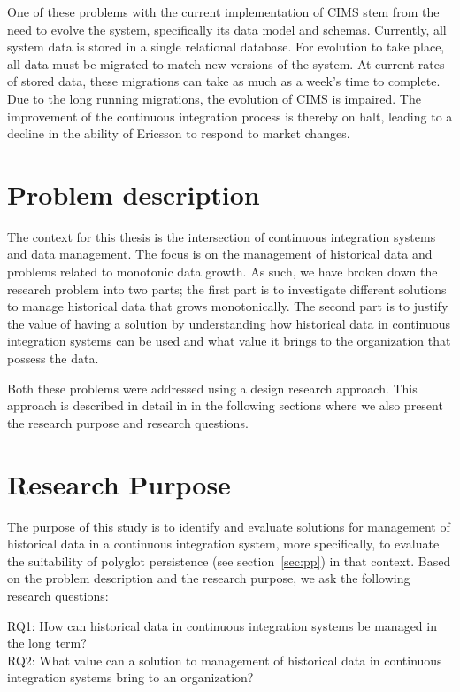 One of these problems with the current implementation of CIMS stem from the need to evolve the system, specifically its data model and schemas. Currently, all system data is stored in a single relational database. For evolution to take place, all data must be migrated to match new versions of the system. At current rates of stored data, these migrations can take as much as a week's time to complete. Due to the long running migrations, the evolution of CIMS is impaired. The improvement of the continuous integration process is thereby on halt, leading to a decline in the ability of Ericsson to respond to market changes.

\section{Problem description}
The context for this thesis is the intersection of continuous integration systems and data management. The focus is on the management of historical data and problems related to monotonic data growth. As such, we have broken down the research problem into two parts; the first part is to investigate different solutions to manage historical data that grows monotonically. The second part is to justify the value of having a solution by understanding how historical data in continuous integration systems can be used and what value it brings to the organization that possess the data. 

Both these problems were addressed using a design research approach. This approach is described in detail in in the following sections where we also present the research purpose and research questions.

\section{Research Purpose}
The purpose of this study is to identify and evaluate solutions for management of historical data in a continuous integration system, more specifically, to evaluate the suitability of polyglot persistence (see section~\ref{sec:pp}) in that context. Based on the problem description and the research purpose, we ask the following research questions:

RQ1: How can historical data in continuous integration systems be managed in the long term? \\
RQ2: What value can a solution to management of historical data in continuous integration systems bring to an organization?

